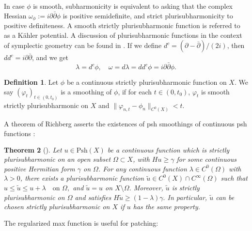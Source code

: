 \documentclass{article}
\def\d{\partial}
\newtheorem{theorem}{Theorem}[section]
\theoremstyle{definition}
\newtheorem{definition}
[theorem]{Definition}
\begin{document}
In case $\phi$ is smooth, subharmonicity is equivalent to asking that the complex Hessian $\omega_\phi :=  i \partial \bar \partial \phi$ is positive semidefinite, and strict plurisubharmonicity
to positive definiteness.  A smooth strictly plurisubharmonic function is referred to as a K\"ahler potential.  A discussion of plurisubharmonic functions in the context of symplectic geometry can be found in \cite{cieliebak-eliashberg}. If we define $d^c =  (\d - \bar \d)/(2i)$, then $ d d^c = i \d \bar \d$, and we get
$$ \lambda = d^c \phi, \quad \omega = d \lambda = dd^c \phi = i \d \bar \d \phi. $$




\begin{definition}
    Let $\phi$ be a continuous 
    strictly plurisubharmonic function on $X$. 
    We say $(\varphi_t)_{t \in (0, t_0)}$ is a smoothing of $\phi$,  if for each $t \in (0, t_0)$, $\varphi_t$ is smooth strictly plurisubharmonic on $X$ and   $ \|\varphi_{n,t} - \phi_n\|_{C^0(X)} < t$.
\end{definition}
 

A theorem of Richberg asserts the existences of psh smoothings of continuous psh functions \cite{richberg1967stetige}: 

\begin{theorem}[]\label{thm:richberg}
Let $u \in \mathrm{Psh}(X)$ be a continuous function which is strictly
plurisubharmonic on an open subset $\Omega \subset X$, with
$
Hu \ge \gamma
$
for some continuous positive Hermitian form $\gamma$ on $\Omega$.
For any continuous function $\lambda \in C^0(\Omega)$ with $\lambda > 0$,
there exists a plurisubharmonic function
$
\tilde u \in C^0(X) \cap C^\infty(\Omega)
$
such that
$
u \le \tilde u \le u + \lambda \quad \text{on } \Omega,
$
and $\tilde u = u$ on $X \setminus \Omega$. Moreover, $\tilde u$ is
strictly plurisubharmonic on $\Omega$ and satisfies
$
H\tilde u \ge (1-\lambda)\gamma.
$
In particular, $\tilde u$ can be chosen strictly plurisubharmonic on $X$
if $u$ has the same property.
\end{theorem}

The regularized max function is useful for patching: 
\end{document}
